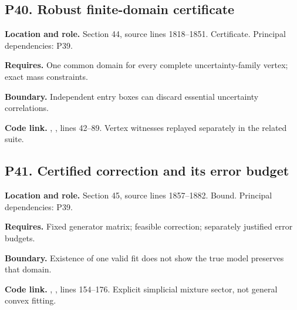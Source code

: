 \documentclass[11pt,oneside,openany]{book}
\numberwithin{equation}{section}
\begin{document}
\par\noindent\begin{minipage}{\textwidth}
\subsection{P40. Robust finite-domain
certificate}\label{LSMRegister:p40.-robust-finite-domain-certificate}

\textbf{Location and role.} Section 44, source lines 1818--1851.
Certificate. Principal dependencies: P39.

\textbf{Requires.} One common domain for every complete
uncertainty-family vertex; exact mass constraints.

\textbf{Boundary.} Independent entry boxes can discard essential
uncertainty correlations.

\textbf{Code link.} ,
, lines 42--89. Vertex witnesses replayed
separately in the related suite.
\end{minipage}\par\medskip

\par\noindent\begin{minipage}{\textwidth}
\subsection{P41. Certified correction and its error
budget}\label{LSMRegister:p41.-certified-correction-and-its-error-budget}

\textbf{Location and role.} Section 45, source lines 1857--1882. Bound.
Principal dependencies: P39.

\textbf{Requires.} Fixed generator matrix; feasible correction;
separately justified error budgets.

\textbf{Boundary.} Existence of one valid fit does not show the true
model preserves that domain.

\textbf{Code link.} ,
, lines 154--176. Explicit simplicial
mixture sector, not general convex fitting.
\end{minipage}\par\medskip
\end{document}
